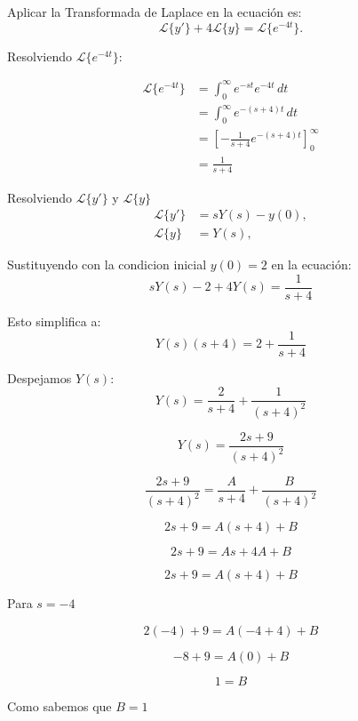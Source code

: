 \documentclass{article}
\begin{document}
Aplicar la Transformada de Laplace en la ecuación es:
\begin{equation*}
    \mathcal{L}\{y'\} + 4\mathcal{L}\{y\} = \mathcal{L}\{e^{-4t}\}.
\end{equation*}

Resolviendo $\mathcal{L}\{e^{-4t}\}$:

\begin{align*}
    \mathcal{L}\{e^{-4t}\} & = \int_0^\infty e^{-st}e^{-4t}\,dt                  \\
                           & = \int_0^\infty e^{-(s+4)t}\,dt                     \\
                           & = \left[ -\frac{1}{s+4}e^{-(s+4)t} \right]_0^\infty \\
                           & = \frac{1}{s + 4}
\end{align*}

Resolviendo $\mathcal{L}\{y'\}$ y $\mathcal{L}\{y\}$
\begin{align*}
    \mathcal{L}\{y'\} & = sY(s) - y(0), \\
    \mathcal{L}\{y\}  & = Y(s),
\end{align*}

Sustituyendo con la condicion inicial \(y(0) = 2\) en la ecuación:
\begin{equation*}
    sY(s) - 2 + 4Y(s) = \frac{1}{s + 4}
\end{equation*}

Esto simplifica a:
\begin{equation*}
    Y(s)(s + 4) = 2 + \frac{1}{s + 4}
\end{equation*}

Despejamos \(Y(s)\):
\begin{equation*}
    Y(s) = \frac{2}{s + 4} + \frac{1}{(s + 4)^2}
\end{equation*}

\[
    Y(s) = \frac{2s+9}{(s + 4)^2}
\]

\[\frac{2s+9}{(s + 4)^2} = \frac{A}{s+4} + \frac{B}{(s+4)^2}\]

\[2s+9 = A(s+4) + B\]

\[2s+9 = As+4A + B\]

\[2s+9 = A(s+4) + B\]

Para $s=-4$

\[2(-4)+9 = A(-4+4) + B\]

\[-8 + 9 = A(0) + B\]

\[1 = B\]

Como sabemos que $B=1$
\end{document}
